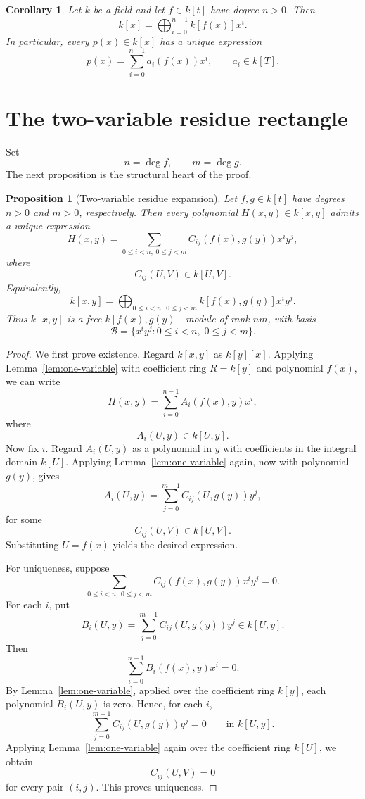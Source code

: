 \documentclass[11pt]{article}
\theoremstyle{plain}
\newtheorem{proposition}[theorem]{Proposition}
\newtheorem{corollary}[theorem]{Corollary}
\theoremstyle{definition}
\theoremstyle{remark}
\newcommand{\U}{U}
\newcommand{\V}{V}
\newcommand{\calB}{\mathcal B}
\begin{document}
\begin{corollary}\label{cor:univariate-kf}
Let \(k\) be a field and let \(f\in k[t]\) have degree \(n>0\). Then
\[
    k[x]
    =
    \bigoplus_{i=0}^{n-1} k[f(x)]x^i.
\]
In particular, every \(p(x)\in k[x]\) has a unique expression
\[
    p(x)=\sum_{i=0}^{n-1} a_i(f(x))x^i,
    \qquad a_i\in k[T].
\]
\end{corollary}

\section{The two-variable residue rectangle}

Set
\[
    n=\deg f,
    \qquad
    m=\deg g.
\]
The next proposition is the structural heart of the proof.

\begin{proposition}[Two-variable residue expansion]\label{prop:bivariate-expansion}
Let \(f,g\in k[t]\) have degrees \(n>0\) and \(m>0\), respectively. Then every polynomial \(H(x,y)\in k[x,y]\) admits a unique expression
\[
    H(x,y)
    =
    \sum_{0\leq i<n,\;0\leq j<m}
    C_{ij}(f(x),g(y))x^i y^j,
\]
where
\[
    C_{ij}(\U,\V)\in k[\U,\V].
\]
Equivalently,
\[
    k[x,y]
    =
    \bigoplus_{0\leq i<n,\;0\leq j<m}
    k[f(x),g(y)]x^i y^j.
\]
Thus \(k[x,y]\) is a free \(k[f(x),g(y)]\)-module of rank \(nm\), with basis
\[
    \calB=
    \{x^i y^j:0\leq i<n,
    \;0\leq j<m\}.
\]
\end{proposition}

\begin{proof}
We first prove existence. Regard \(k[x,y]\) as \(k[y][x]\). Applying Lemma~\ref{lem:one-variable} with coefficient ring \(R=k[y]\) and polynomial \(f(x)\), we can write
\[
    H(x,y)
    =
    \sum_{i=0}^{n-1} A_i(f(x),y)x^i,
\]
where
\[
    A_i(\U,y)\in k[\U,y].
\]
Now fix \(i\). Regard \(A_i(\U,y)\) as a polynomial in \(y\) with coefficients in the integral domain \(k[\U]\). Applying Lemma~\ref{lem:one-variable} again, now with polynomial \(g(y)\), gives
\[
    A_i(\U,y)
    =
    \sum_{j=0}^{m-1} C_{ij}(\U,g(y))y^j,
\]
for some
\[
    C_{ij}(\U,\V)
    \in
    k[\U,\V].
\]
Substituting \(\U=f(x)\) yields the desired expression.

For uniqueness, suppose
\[
    \sum_{0\leq i<n,\;0\leq j<m}
    C_{ij}(f(x),g(y))x^i y^j=0.
\]
For each \(i\), put
\[
    B_i(\U,y)
    =
    \sum_{j=0}^{m-1} C_{ij}(\U,g(y))y^j
    \in k[\U,y].
\]
Then
\[
    \sum_{i=0}^{n-1} B_i(f(x),y)x^i=0.
\]
By Lemma~\ref{lem:one-variable}, applied over the coefficient ring \(k[y]\), each polynomial \(B_i(\U,y)\) is zero. Hence, for each \(i\),
\[
    \sum_{j=0}^{m-1} C_{ij}(\U,g(y))y^j=0
    \qquad \text{in } k[\U,y].
\]
Applying Lemma~\ref{lem:one-variable} again over the coefficient ring \(k[\U]\), we obtain
\[
    C_{ij}(\U,\V)=0
\]
for every pair \((i,j)\). This proves uniqueness.
\end{proof}
\end{document}
